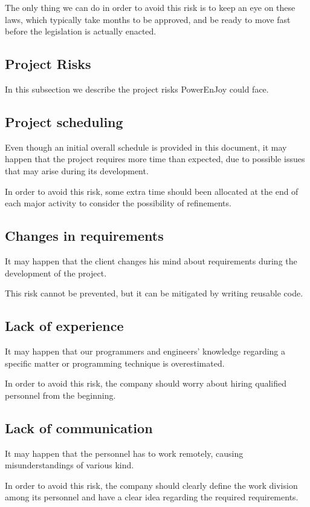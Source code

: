 The only thing we can do in order to avoid this risk is to keep an eye on these laws, which typically take months to be approved, and be ready to move fast before the legislation is actually enacted.
\newpage
\subsection{Project Risks}
In this subsection we describe the project risks PowerEnJoy could face.

\subsection*{Project scheduling}
Even though an initial overall schedule is provided in this document, it may happen that the project requires more time than expected, due to possible issues that may arise during its development.

In order to avoid this risk, some extra time should been allocated at the end of each major activity to consider the possibility of refinements. 

\subsection*{Changes in requirements}
It may happen that the client changes his mind about requirements during the development of the project.

This risk cannot be prevented, but it can be mitigated by writing reusable code.

\subsection*{Lack of experience}
It may happen that our programmers and engineers' knowledge regarding a specific matter or programming technique is overestimated. 

In order to avoid this risk, the company should worry about hiring qualified personnel from the beginning. 

\subsection*{Lack of communication}
It may happen that the personnel has to work remotely, causing misunderstandings of various kind. 

In order to avoid this risk, the company should clearly define the work division among its personnel and have a clear idea regarding the required requirements.
\newpage

